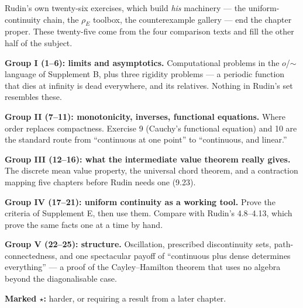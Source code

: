 
\begin{roadmap}
Rudin's own twenty-six exercises, which build \emph{his} machinery --- the
uniform-continuity chain, the $\rho_E$ toolbox, the counterexample gallery
--- end the chapter proper. These twenty-five come from the four comparison
texts and fill the other half of the subject.

\medskip
\raggedright
\textbf{Group I (1--6): limits and asymptotics.} Computational problems in the
$o$/$\sim$ language of Supplement B, plus three rigidity problems --- a
periodic function that dies at infinity is dead everywhere, and its
relatives. Nothing in Rudin's set resembles these.

\smallskip
\textbf{Group II (7--11): monotonicity, inverses, functional equations.}
Where order replaces compactness. Exercise 9 (Cauchy's functional equation)
and 10 are the standard route from ``continuous at one point'' to
``continuous, and linear.''

\smallskip
\textbf{Group III (12--16): what the intermediate value theorem really
gives.} The discrete mean value property, the universal chord theorem, and a
contraction mapping five chapters before Rudin needs one (9.23).

\smallskip
\textbf{Group IV (17--21): uniform continuity as a working tool.} Prove the
criteria of Supplement E, then use them. Compare with Rudin's 4.8--4.13,
which prove the same facts one at a time by hand.

\smallskip
\textbf{Group V (22--25): structure.} Oscillation, prescribed discontinuity
sets, path-connectedness, and one spectacular payoff of ``continuous plus
dense determines everything'' --- a proof of the Cayley--Hamilton theorem
that uses no algebra beyond the diagonalisable case.

\medskip
\textbf{Marked $\star$:} harder, or requiring a result from a later chapter.
\end{roadmap}

